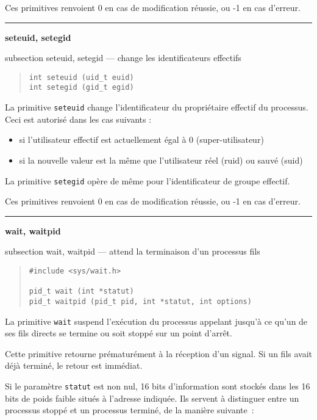 \documentclass [twoside] {report}
\newcommand {\primitive} [1]
    {
	\phantomsection
	{\large \textbf {#1}}
	\addcontentsline {toc} {subsection} {#1}
    }
\newcommand {\separation}
    {
	\vspace {5mm}
	\nopagebreak
	\hrule
    }
\begin{document}
Ces primitives renvoient 0 en cas de modification
réussie, ou -1 en cas d'erreur.




\separation
\primitive {seteuid, setegid} --- change les identificateurs effectifs

\begin {quote}
\begin {verbatim}
int seteuid (uid_t euid)
int setegid (gid_t egid)
\end{verbatim}
\end {quote}

La primitive \texttt {seteuid} change l'identificateur du propriétaire
effectif du processus. Ceci est autorisé dans les cas suivants :

\begin {itemize}
    \item si l'utilisateur effectif est actuellement égal à 0
	(super-utilisateur)
    \item si la nouvelle valeur est la même que l'utilisateur réel
	(ruid) ou sauvé (suid)
\end {itemize}

La primitive \texttt {setegid} opère de même pour l'identificateur
de groupe effectif.

Ces primitives renvoient 0 en cas de modification
réussie, ou -1 en cas d'erreur.




\separation
\primitive {wait, waitpid} --- attend la terminaison d'un processus fils

\begin {quote}
\begin {verbatim}
#include <sys/wait.h>

pid_t wait (int *statut)
pid_t waitpid (pid_t pid, int *statut, int options)
\end{verbatim}
\end {quote}

La primitive \texttt {wait} suspend l'exécution du
processus appelant jusqu'à ce qu'un de ses fils
directs se termine ou soit stoppé sur un point
d'arrêt.

Cette primitive retourne prématurément à la
réception d'un signal. Si un fils avait déjà
terminé, le retour est immédiat.

Si le paramètre \texttt {statut} est non nul, 16 bits
d'information sont stockés dans les 16 bits de
poids faible situés à l'adresse indiquée. Ils
servent à distinguer entre un processus stoppé et
un processus terminé, de la manière suivante~:
\end{document}
